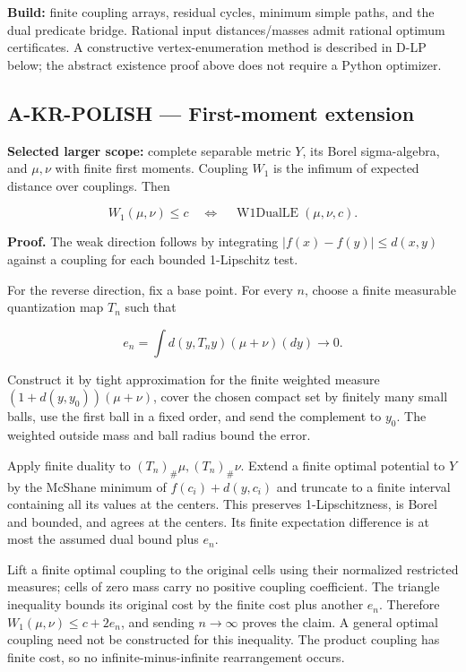 \documentclass[
  11pt,
  a4paper,
]{article}
\begin{document}
\textbf{Build:} finite coupling arrays, residual cycles, minimum simple
paths, and the dual predicate bridge. Rational input distances/masses
admit rational optimum certificates. A constructive vertex-enumeration
method is described in D-LP below; the abstract existence proof above
does not require a Python optimizer.

\subsection{A-KR-POLISH --- First-moment
extension}\label{a-kr-polish-first-moment-extension}

\textbf{Selected larger scope:} complete separable metric \(Y\), its
Borel sigma-algebra, and \(\mu,\nu\) with finite first moments. Coupling
\(W_1\) is the infimum of expected distance over couplings. Then

\[W_1(\mu,\nu)\le c\quad\Longleftrightarrow\quad
\operatorname{W1DualLE}(\mu,\nu,c).\]

\textbf{Proof.} The weak direction follows by integrating
\(|f(x)-f(y)|\le d(x,y)\) against a coupling for each bounded
1-Lipschitz test.

For the reverse direction, fix a base point. For every \(n\), choose a
finite measurable quantization map \(T_n\) such that

\[e_n=\int d(y,T_ny)(\mu+\nu)(dy)\longrightarrow0.\]

Construct it by tight approximation for the finite weighted measure
\((1+d(y,y_0))(\mu+\nu)\), cover the chosen compact set by finitely many
small balls, use the first ball in a fixed order, and send the
complement to \(y_0\). The weighted outside mass and ball radius bound
the error.

Apply finite duality to \((T_n)_\#\mu,(T_n)_\#\nu\). Extend a finite
optimal potential to \(Y\) by the McShane minimum of \(f(c_i)+d(y,c_i)\)
and truncate to a finite interval containing all its values at the
centers. This preserves 1-Lipschitzness, is Borel and bounded, and
agrees at the centers. Its finite expectation difference is at most the
assumed dual bound plus \(e_n\).

Lift a finite optimal coupling to the original cells using their
normalized restricted measures; cells of zero mass carry no positive
coupling coefficient. The triangle inequality bounds its original cost
by the finite cost plus another \(e_n\). Therefore
\(W_1(\mu,\nu)\le c+2e_n\), and sending \(n\to\infty\) proves the claim.
A general optimal coupling need not be constructed for this inequality.
The product coupling has finite cost, so no infinite-minus-infinite
rearrangement occurs.
\end{document}
